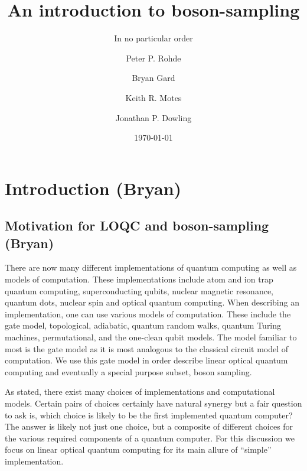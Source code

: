 \documentclass[aps,pra,twocolumn,amsmath,amssymb,nofootinbib,superscriptaddress]{revtex4}
\begin{document}


%
% 

\title{An introduction to boson-sampling}

%
%

\author{In no particular order}

\author{Peter P. Rohde}

\author{Bryan Gard}

\author{Keith R. Motes}

\author{Jonathan P. Dowling}

\date{\today}

\frenchspacing

%
%

\begin{abstract}
\end{abstract}

\maketitle

\section{Introduction (Bryan)}

\subsection{Motivation for LOQC and boson-sampling (Bryan)}
There are now many different implementations of quantum computing as well as models of computation. These implementations include atom and ion trap quantum computing, superconducting qubits, nuclear magnetic resonance, quantum dots, nuclear spin and optical quantum computing. When describing an implementation, one can use various models of computation. These include the gate model, topological, adiabatic, quantum random walks, quantum Turing machines, permutational, and the one-clean qubit models. The model familiar to most is the gate model as it is most analogous to the classical circuit model of computation. We use this gate model in order describe linear optical quantum computing and eventually a special purpose subset, boson sampling.

	As stated, there exist many choices of implementations and computational models. Certain pairs of choices certainly have natural synergy but a fair question to ask is, which choice is likely to be the first implemented quantum computer? The answer is likely not just one choice, but a composite of different choices for the various required components of a quantum computer. For this discussion we focus on linear optical quantum computing for its main allure of ``simple'' implementation.
\end{document}
